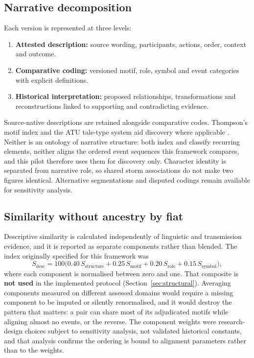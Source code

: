 \documentclass[11pt]{article}
\DeclareRobustCommand{\_}{\textunderscore\allowbreak}
\begin{document}
\subsection{Narrative decomposition}

Each version is represented at three levels:
\begin{enumerate}
  \item \textbf{Attested description:} source wording, participants, actions,
        order, context and outcome.
  \item \textbf{Comparative coding:} versioned motif, role, symbol and event
        categories with explicit definitions.
  \item \textbf{Historical interpretation:} proposed relationships,
        transformations and reconstructions linked to supporting and
        contradicting evidence.
\end{enumerate}
Source-native descriptions are retained alongside comparative codes. Thompson's
motif index and the ATU tale-type system aid discovery where applicable
\citep{thompson1955,uther2004}. Neither is an ontology of narrative structure: both index
and classify recurring elements, neither aligns the ordered event sequences this framework
compares, and this pilot therefore uses them for discovery only.
Character identity is separated from narrative role, so shared storm
associations do not make two figures identical. Alternative segmentations and
disputed codings remain available for sensitivity analysis.

\subsection{Similarity without ancestry by fiat}

Descriptive similarity is calculated independently of linguistic and transmission
evidence, and it is reported as separate components rather than blended. The
index originally specified for this framework was
\begin{equation}
  S_{\mathrm{desc}} = 100\bigl(0.40\,S_{\mathrm{structure}}
    + 0.25\,S_{\mathrm{motif}} + 0.20\,S_{\mathrm{role}}
    + 0.15\,S_{\mathrm{symbol}}\bigr),
  \label{eq:composite}
\end{equation}
where each component is normalised between zero and one. That composite is
\textbf{not used} in the implemented protocol (Section~\ref{sec:structural}).
Averaging components measured on different assessed domains would require a
missing component to be imputed or silently renormalised, and it would destroy
the pattern that matters: a pair can share most of its adjudicated motifs while
aligning almost no events, or the reverse. The component weights were
research-design choices subject to sensitivity analysis, not validated historical
constants, and that analysis confirms the ordering is bound to alignment
parameters rather than to the weights.
\end{document}
